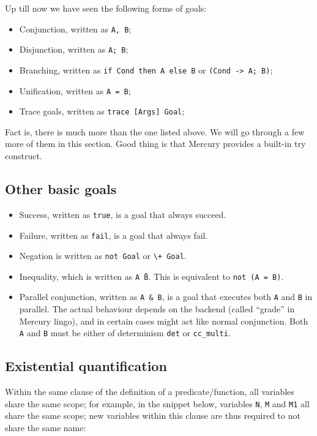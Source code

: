 Up till now we have seen the following forms of goals:

\begin{itemize}
\item Conjunction, written as \texttt{A, B};
\item Disjunction, written as \texttt{A; B};
\item Branching, written as \texttt{if Cond then A else B} or \texttt{(Cond -> A; B)};
\item Unification, written as \texttt{A = B};
  \item Trace goals, written as \texttt{trace [Args] Goal};
\end{itemize}

Fact is, there is much more than the one listed above. We will go through a few more of them in this section. Good thing is that Mercury provides a built-in try construct.

\subsection{Other basic goals}

\begin{itemize}
\item Success, written as \texttt{true}, is a goal that always succeed.
\item Failure, written as \texttt{fail}, is a goal that always fail.
\item Negation is written as \texttt{not Goal} or \texttt{\textbackslash + Goal}.
\item Inequality, which is written as \texttt{A \= B}. This is equivalent to \texttt{not (A = B)}.
  \item Parallel conjunction, written as \texttt{A \& B}, is a goal that executes both \texttt{A} and \texttt{B} in parallel. The actual behaviour depends on the backend (called ``grade'' in Mercury lingo), and in certain cases might act like normal conjunction. Both \texttt{A} and \texttt{B} must be either of determinism \texttt{det} or \texttt{cc_multi}.
\end{itemize}


\subsection{Existential quantification}

Within the same clause of the definition of a predicate/function, all variables share the same scope; for example, in the snippet below, variables \texttt{N}, \texttt{M} and \texttt{M1} all share the same scope; new variables within this clause are thus required to not share the same name:

